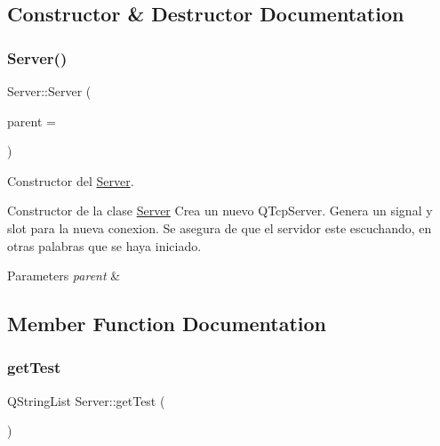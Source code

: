 \subsection{Constructor \& Destructor Documentation}
\mbox{\label{classServer_a1950ac036d86af898428d7ba39bbf048}} 
\subsubsection{\texorpdfstring{Server()}{Server()}}
{\footnotesize\ttfamily Server\+::\+Server (\begin{DoxyParamCaption}\item[{Q\+Object $\ast$}]{parent = {} }\end{DoxyParamCaption})\hspace{0.3cm}{\ttfamily [explicit]}}



Constructor del \hyperlink{classServer}{Server}. 

Constructor de la clase \hyperlink{classServer}{Server} Crea un nuevo Q\+Tcp\+Server. Genera un signal y slot para la nueva conexion. Se asegura de que el servidor este escuchando, en otras palabras que se haya iniciado.


\begin{DoxyParams}{Parameters}
{\em parent} & \\
\hline
\end{DoxyParams}


\subsection{Member Function Documentation}
\mbox{\label{classServer_a257377ec86bcf1986bd5187ce99f3258}} 
\subsubsection{\texorpdfstring{get\+Test}{getTest}}
{\footnotesize\ttfamily Q\+String\+List Server\+::get\+Test (\begin{DoxyParamCaption}{ }\end{DoxyParamCaption})\hspace{0.3cm}{\ttfamily [slot]}}



